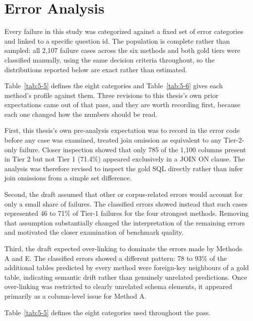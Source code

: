 \section{Error Analysis}\label{sec:5-5}

Every failure in this study was categorized against a fixed set of error categories and linked to a specific question id. The population is complete rather than sampled: all 2,107 failure cases across the six methods and both gold tiers were classified manually, using the same decision criteria throughout, so the distributions reported below are exact rather than estimated.

Table~\ref{tab:5-5} defines the eight categories and Table~\ref{tab:5-6} gives each method's profile against them. Three revisions to this thesis's own prior expectations came out of that pass, and they are worth recording first, because each one changed how the numbers should be read.

First, this thesis's own pre-analysis expectation was to record in the error code before any case was examined, treated join omission as equivalent to any Tier-2-only failure. Closer inspection showed that only 785 of the 1,100 columns present in Tier 2 but not Tier 1 (71.4\%) appeared exclusively in a JOIN ON clause. The analysis was therefore revised to inspect the gold SQL directly rather than infer join omissions from a simple set difference.

Second, the draft assumed that other or corpus-related errors would account for only a small share of failures. The classified errors showed instead that such cases represented 46 to 71\% of Tier-1 failures for the four strongest methods. Removing that assumption substantially changed the interpretation of the remaining errors and motivated the closer examination of benchmark quality.

Third, the draft expected over-linking to dominate the errors made by Methods A and E. The classified errors showed a different pattern: 78 to 93\% of the additional tables predicted by every method were foreign-key neighbours of a gold table, indicating semantic drift rather than genuinely unrelated predictions. Once over-linking was restricted to clearly unrelated schema elements, it appeared primarily as a column-level issue for Method A.

Table~\ref{tab:5-5} defines the eight categories used throughout the pass.

